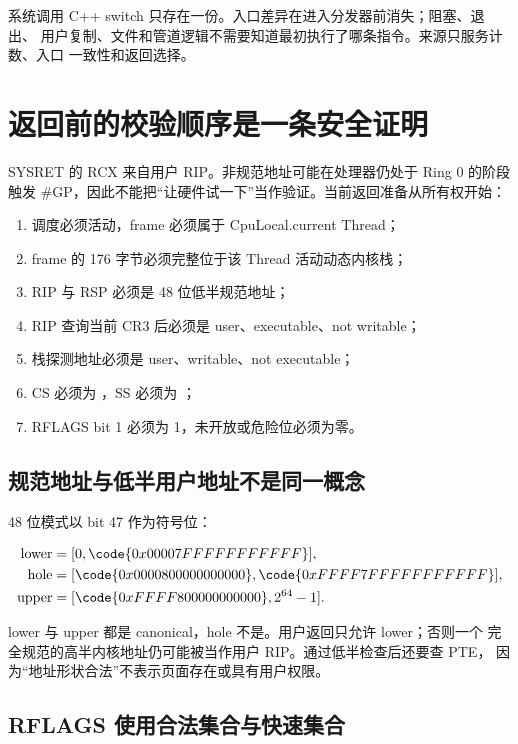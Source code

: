 系统调用 C++ switch 只存在一份。入口差异在进入分发器前消失；阻塞、退出、
用户复制、文件和管道逻辑不需要知道最初执行了哪条指令。来源只服务计数、入口
一致性和返回选择。

\section{返回前的校验顺序是一条安全证明}

SYSRET 的 RCX 来自用户 RIP。非规范地址可能在处理器仍处于 Ring 0 的阶段
触发 \#GP，因此不能把“让硬件试一下”当作验证。当前返回准备从所有权开始：

\begin{enumerate}[label=\arabic*.]
  \item 调度必须活动，frame 必须属于 CpuLocal.current Thread；
  \item frame 的 176 字节必须完整位于该 Thread 活动动态内核栈；
  \item RIP 与 RSP 必须是 48 位低半规范地址；
  \item RIP 查询当前 CR3 后必须是 user、executable、not writable；
  \item 栈探测地址必须是 user、writable、not executable；
  \item CS 必须为 ，SS 必须为 ；
  \item RFLAGS bit 1 必须为 1，未开放或危险位必须为零。
\end{enumerate}

\subsection{规范地址与低半用户地址不是同一概念}

48 位模式以 bit 47 作为符号位：

\[
\begin{aligned}
\text{lower} &= [0,\code{0x00007FFFFFFFFFFF}],\\
\text{hole}  &= [\code{0x0000800000000000},
                  \code{0xFFFF7FFFFFFFFFFF}],\\
\text{upper} &= [\code{0xFFFF800000000000},2^{64}-1].
\end{aligned}
\]

lower 与 upper 都是 canonical，hole 不是。用户返回只允许 lower；否则一个
完全规范的高半内核地址仍可能被当作用户 RIP。通过低半检查后还要查 PTE，
因为“地址形状合法”不表示页面存在或具有用户权限。

\subsection{RFLAGS 使用合法集合与快速集合}

